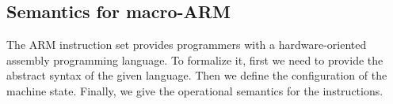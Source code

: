 \documentclass[letterpaper, 10 pt, conference]{IEEEtran}
\begin{document}
\subsection{Semantics for macro-ARM}
The ARM instruction set provides programmers with a hardware-oriented assembly programming language. To formalize it, first we need to provide the abstract syntax of the given language. Then we define the configuration of the machine state. Finally, we give the operational semantics for the instructions.
%
\end{document}
